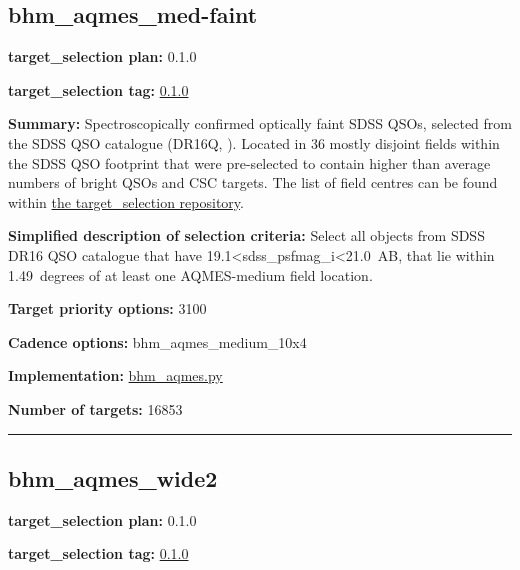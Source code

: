 \hypertarget{bhm_aqmes_med-faint_plan0.1.0}{%
\subsection{bhm\_aqmes\_med-faint}\label{bhm_aqmes_med-faint_plan0.1.0}}

\noindent\textbf{target\_selection plan:} 0.1.0

\noindent\textbf{target\_selection tag:}
\href{https://github.com/sdss/target_selection/tree/0.1.0/}{0.1.0}

\noindent\textbf{Summary:} Spectroscopically confirmed optically faint SDSS QSOs,
selected from the SDSS QSO catalogue (DR16Q,
\citealt{Lyke2020}). Located in 36 mostly disjoint fields within the SDSS QSO
footprint that were pre-selected to contain higher than average numbers
of bright QSOs and CSC targets. The list of field centres can be found
within
\href{https://github.com/sdss/target_selection/blob/0.1.0/python/target_selection/masks/candidate_target_fields_bhm_aqmes_med_v0.2.1.fits}{the
target\_selection repository}.

\noindent\textbf{Simplified description of selection criteria:} Select all
objects from SDSS DR16 QSO catalogue that have
19.1\textless sdss\_psfmag\_i\textless21.0~AB, that lie within
1.49~degrees of at least one AQMES-medium field location.


\noindent\textbf{Target priority options:} 3100

\noindent\textbf{Cadence options:} bhm\_aqmes\_medium\_10x4

\noindent\textbf{Implementation:}
\href{https://github.com/sdss/target_selection/blob/0.1.0/python/target_selection/cartons/bhm_aqmes.py}{bhm\_aqmes.py}

\noindent\textbf{Number of targets:} 16853

\begin{center}\rule{0.5\linewidth}{0.5pt}\end{center}

\hypertarget{bhm_aqmes_wide2_plan0.1.0}{%
\subsection{bhm\_aqmes\_wide2}\label{bhm_aqmes_wide2_plan0.1.0}}

\noindent\textbf{target\_selection plan:} 0.1.0

\noindent\textbf{target\_selection tag:}
\href{https://github.com/sdss/target_selection/tree/0.1.0/}{0.1.0}


